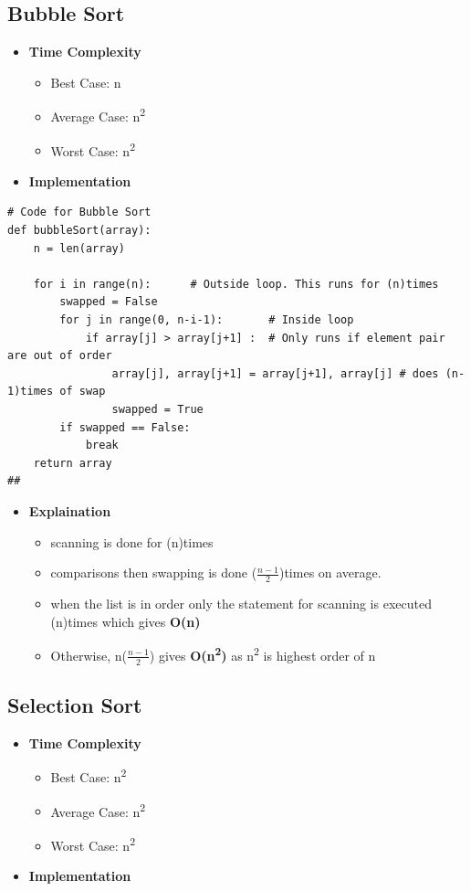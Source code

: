 \documentclass{article}
\begin{document}
\subsection{Bubble Sort}
\begin{itemize}
    \item \textbf{Time Complexity}
        \begin{itemize}
            \item Best Case: n
            \item Average Case: n\textsuperscript{2}
            \item Worst Case: n\textsuperscript{2}
        \end{itemize}
    \item \textbf{Implementation}
\end{itemize}

\begin{verbatim}
# Code for Bubble Sort
def bubbleSort(array):
    n = len(array)

    for i in range(n):      # Outside loop. This runs for (n)times
        swapped = False
        for j in range(0, n-i-1):       # Inside loop
            if array[j] > array[j+1] :  # Only runs if element pair are out of order
                array[j], array[j+1] = array[j+1], array[j] # does (n-1)times of swap
                swapped = True
        if swapped == False:
            break
    return array
##
\end{verbatim}
\begin{itemize}
    \item \textbf{Explaination}
    \begin{itemize}
        \item scanning is done for (n)times
        \item comparisons then swapping is done (\( \frac{n-1}{2} \))times on average.
        \item when the list is in order only the statement for scanning is executed (n)times which gives \textbf{O(n)}
        \item Otherwise, n(\( \frac{n-1}{2} \)) gives \textbf{O(n\textsuperscript{2})} as n\textsuperscript{2} is highest order of n
    \end{itemize}
\end{itemize}

\clearpage

\subsection{Selection Sort}
\begin{itemize}
    \item \textbf{Time Complexity}
        \begin{itemize}
            \item Best Case: n\textsuperscript{2}
            \item Average Case: n\textsuperscript{2}
            \item Worst Case: n\textsuperscript{2}
        \end{itemize}
    \item \textbf{Implementation}
\end{itemize}
\end{document}
